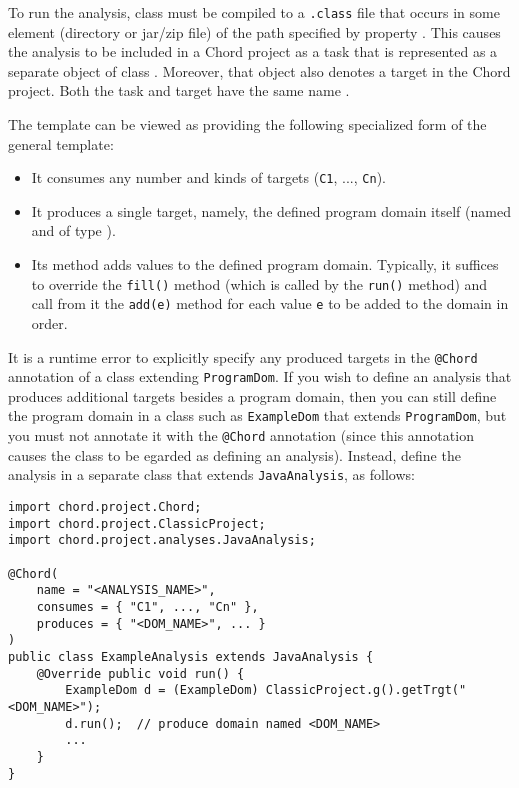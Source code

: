 To run the analysis, class  must be compiled to a {\tt .class}
file that occurs in some element (directory or jar/zip file) of the path
specified by property .  This causes the
analysis to be included in a Chord project as a task that is represented as a
separate object of class .  Moreover, that object also denotes
a target in the Chord project.  Both the task and target have the same name
.

The  template can be viewed as providing the following
specialized form of the general  template:

\begin{itemize}
\item
It consumes any number and kinds of targets ({\tt C1}, ..., {\tt Cn}).
\item
It produces a single target, namely, the defined program domain itself
(named  and of type ).
\item
Its  method adds values to the defined program domain.  Typically,
it suffices to override the {\tt fill()} method (which is called by the
{\tt run()} method) and call from it the {\tt add(e)} method for each value
{\tt e} to be added to the domain in order.
\end{itemize}

It is a runtime error to explicitly specify any produced targets in the
{\tt @Chord} annotation of a class extending {\tt ProgramDom}.  If you wish to
define an analysis that produces additional targets besides a program domain,
then you can still define the program domain in a class such as
{\tt ExampleDom} that extends {\tt ProgramDom}, but you must not annotate it
with the {\tt @Chord} annotation (since this annotation causes the class to be 
egarded as defining an analysis).  Instead, define the analysis in a separate
class that extends {\tt JavaAnalysis}, as follows:

\begin{framed}
\begin{verbatim}
import chord.project.Chord;
import chord.project.ClassicProject;
import chord.project.analyses.JavaAnalysis;

@Chord(
    name = "<ANALYSIS_NAME>",
    consumes = { "C1", ..., "Cn" },
    produces = { "<DOM_NAME>", ... }
)
public class ExampleAnalysis extends JavaAnalysis {
    @Override public void run() {
        ExampleDom d = (ExampleDom) ClassicProject.g().getTrgt("<DOM_NAME>");
        d.run();  // produce domain named <DOM_NAME>
        ...
    }
}
\end{verbatim}
\end{framed}


